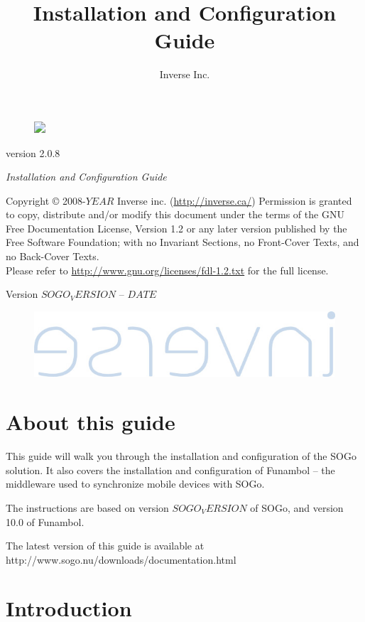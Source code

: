 \documentclass[]{article}
\title{Installation and Configuration Guide}
\author{Inverse Inc.}
\date{}
\makeatletter
\def\maxwidth{\ifdim\Gin@nat@width>\linewidth\linewidth
\else\Gin@nat@width\fi}
\let\Oldincludegraphics\includegraphics
\renewcommand{\includegraphics}[1]{\Oldincludegraphics[width=\maxwidth]{#1}}
\makeatother
\begin{document}
\thispagestyle{empty}
\begin{figure}[htbp]
\Oldincludegraphics[height=4.20cm]{sogo.png}
\end{figure}

\begin{flushright}
\vspace{2in}
{\selectfont \textmd{\Large version 2.0.8}\par}
\bigskip
\textsl{\large Installation and Configuration Guide}\\
\hspace{1.5cm}\hrulefill
\vfill
\end{flushright}
\newpage

Copyright © 2008-$YEAR$ Inverse inc. (\url{http://inverse.ca/})
Permission is granted to copy, distribute and/or modify this document
under the terms of the GNU Free Documentation License, Version 1.2 or
any later version published by the Free Software Foundation; with no
Invariant Sections, no Front-Cover Texts, and no Back-Cover
Texts.\\Please refer to \url{http://www.gnu.org/licenses/fdl-1.2.txt}
for the full license.

Version $SOGO_VERSION$ -- $DATE$

\begin{figure}[htbp]
\centering
\includegraphics{inverse.jpg}
\end{figure}

\section{About this guide}

This guide will walk you through the installation and configuration of
the SOGo solution. It also covers the installation and configuration of
Funambol -- the middleware used to synchronize mobile devices with SOGo.

The instructions are based on version $SOGO_VERSION$ of SOGo, and
version 10.0 of Funambol.

The latest version of this guide is available at
http://www.sogo.nu/downloads/documentation.html

\section{Introduction}
\end{document}
